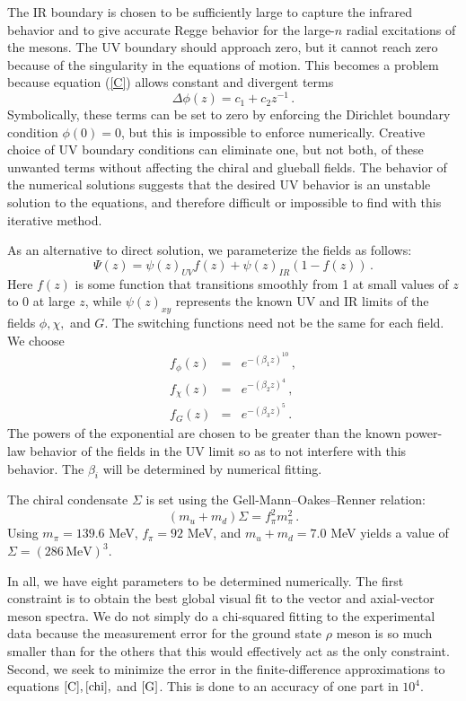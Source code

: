 \documentclass[aps,prd,12pt,nofootinbib]{revtex4}
\newcommand{\be}{\begin{equation}}
\newcommand{\ee}{\end{equation}}
\newcommand{\ba}{\begin{eqnarray}}
\newcommand{\ea}{\end{eqnarray}}
\begin{document}
The IR boundary is chosen to be sufficiently large to capture the infrared behavior and to give accurate Regge behavior for the large-$n$ radial excitations of the mesons. 
The UV boundary should approach zero, but it cannot reach zero because of the singularity in the equations of motion. 
This becomes a problem because equation (\ref{C}) allows constant and divergent terms 
\be
\Delta \phi(z) = c_1 + c_2 z^{-1} \, .
\ee
Symbolically, these terms can be set to zero by enforcing the Dirichlet boundary condition $\phi(0)=0$, but this is impossible to enforce numerically. 
Creative choice of UV boundary conditions can eliminate one, but not both, of these unwanted terms without affecting the chiral and glueball fields. 
The behavior of the numerical solutions suggests that the desired UV behavior is an unstable solution to the equations, and therefore difficult or impossible to find with this iterative method.

As an alternative to direct solution, we parameterize the fields as follows:
\be
\Psi(z) = \psi(z)_{UV} f(z) + \psi(z)_{IR} \left(1-f(z)\right) \, .
\ee
Here $f(z)$ is some function that transitions smoothly from 1 at small values of $z$ to 0 at large $z$, while $\psi(z)_{xy}$ represents the known UV and IR limits of the fields $\phi, \chi,$ and $G$. 
The switching functions need not be the same for each field. We choose 
\ba
f_\phi(z)&=&e^{-(\beta_1z)^{10}} \, , \\ \label{param1}
f_\chi(z)&=&e^{-(\beta_2z)^4} \, , \\  \label{param2}
f_G(z)&=&e^{-(\beta_3z)^5} \, . \label{param3}
\ea
The powers of the exponential are chosen to be greater than the known power-law behavior of the fields in the UV limit so as to not interfere with this behavior. 
The $\beta_i$ will be determined by numerical fitting.

The chiral condensate $\Sigma$ is set using the Gell-Mann--Oakes--Renner relation:
\be
(m_u+m_d)\Sigma = f_\pi^2 m_\pi^2 \, .
\ee
Using $m_\pi = 139.6$ MeV, $f_\pi = 92 $ MeV, and $m_u+m_d = 7.0 $ MeV yields a value of $\Sigma = (286\, \mathrm{MeV})^3$.

In all, we have eight parameters to be determined numerically. 
The first constraint is to obtain the best global visual fit to the vector and axial-vector meson spectra.   
We do not simply do a chi-squared fitting to the experimental data because the measurement error for the ground state $\rho$ meson is so much smaller than for the others that this would effectively act as the only constraint. 
Second, we seek to minimize the error in the finite-difference approximations to equations $\ref{C}, \ref{chi},$ and $\ref{G}$.  
This is done to an accuracy of one part in $10^4$. 
\end{document}

